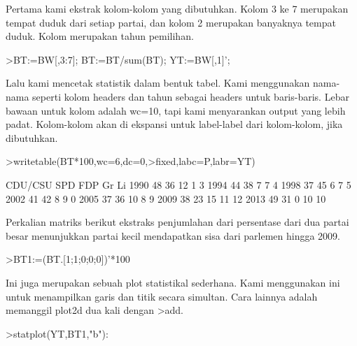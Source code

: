 \documentclass[a4paper,10pt]{article}
\begin{document}
\begin{eulernotebook}
\begin{eulercomment}
Pertama kami ekstrak kolom-kolom yang dibutuhkan. Kolom 3 ke 7 merupakan tempat duduk dari
setiap partai, dan kolom 2 merupakan banyaknya tempat duduk. Kolom merupakan tahun
pemilihan.
\end{eulercomment}
\begin{eulerprompt}
>BT:=BW[,3:7]; BT:=BT/sum(BT); YT:=BW[,1]';
\end{eulerprompt}
\begin{eulercomment}
Lalu kami mencetak statistik dalam bentuk tabel. Kami menggunakan nama-nama seperti kolom
headers dan tahun sebagai headers untuk baris-baris. Lebar bawaan untuk kolom adalah
wc=10, tapi kami menyarankan output yang lebih padat. Kolom-kolom akan di ekspansi untuk
label-label dari kolom-kolom, jika dibutuhkan.
\end{eulercomment}
\begin{eulerprompt}
>writetable(BT*100,wc=6,dc=0,>fixed,labc=P,labr=YT)
\end{eulerprompt}
\begin{euleroutput}
         CDU/CSU   SPD   FDP    Gr    Li
    1990      48    36    12     1     3
    1994      44    38     7     7     4
    1998      37    45     6     7     5
    2002      41    42     8     9     0
    2005      37    36    10     8     9
    2009      38    23    15    11    12
    2013      49    31     0    10    10
\end{euleroutput}
\begin{eulercomment}
Perkalian matriks berikut ekstraks penjumlahan dari persentase dari dua partai besar
menunjukkan partai kecil mendapatkan sisa dari parlemen hingga 2009.
\end{eulercomment}
\begin{eulerprompt}
>BT1:=(BT.[1;1;0;0;0])'*100
\end{eulerprompt}
\begin{euleroutput}
  [84.29,  81.25,  81.1659,  82.7529,  72.9642,  61.8971,  79.8732]
\end{euleroutput}
\begin{eulercomment}
Ini juga merupakan sebuah plot statistikal sederhana. Kami menggunakan ini untuk
menampilkan garis dan titik secara simultan. Cara lainnya adalah memanggil plot2d dua kali
dengan \textgreater{}add.
\end{eulercomment}
\begin{eulerprompt}
>statplot(YT,BT1,"b"):
\end{eulerprompt}
\begin{eulercomment}

\end{eulercomment}
\end{eulernotebook}
\end{document}
